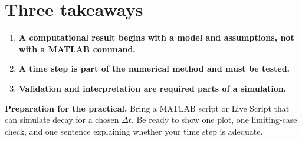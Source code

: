 \documentclass[11pt,a4paper]{article}
\begin{document}
\section*{Three takeaways}
\begin{enumerate}[nosep,leftmargin=5mm]
  \item \textbf{A computational result begins with a model and assumptions, not with a MATLAB command.}
  \item \textbf{A time step is part of the numerical method and must be tested.}
  \item \textbf{Validation and interpretation are required parts of a simulation.}
\end{enumerate}

\begin{keybox}
\textbf{Preparation for the practical.} Bring a MATLAB script or Live Script that can simulate decay for a chosen $\Delta t$. Be ready to show one plot, one limiting-case check, and one sentence explaining whether your time step is adequate.
\end{keybox}
\end{document}
